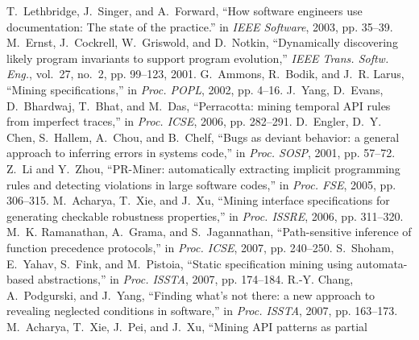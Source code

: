 \documentclass[10pt, conference, compsocconf]{IEEEtran}
\begin{document}
\begin{thebibliography}{10}
T.~Lethbridge, J.~Singer, and A.~Forward, ``How software engineers use
  documentation: The state of the practice.'' in \emph{IEEE Software}, 2003,
  pp. 35--39.
\vspace*{-2ex}
M.~Ernst, J.~Cockrell, W.~Griswold, and D.~Notkin, ``Dynamically discovering
  likely program invariants to support program evolution,'' \emph{IEEE Trans.
  Softw. Eng.}, vol.~27, no.~2, pp. 99--123, 2001.
\vspace*{-2ex}
G.~Ammons, R.~Bodik, and J.~R. Larus, ``{Mining specifications},'' in
  \emph{Proc. POPL}, 2002, pp. 4--16.
\vspace*{-2ex}
J.~Yang, D.~Evans, D.~Bhardwaj, T.~Bhat, and M.~Das, ``{Perracotta: mining
  temporal API rules from imperfect traces},'' in \emph{Proc. ICSE}, 2006, pp.
  282--291.
\vspace*{-2ex}
\vfill\eject
{}
D.~Engler, D.~Y. Chen, S.~Hallem, A.~Chou, and B.~Chelf, ``{Bugs as deviant
  behavior: a general approach to inferring errors in systems code},'' in
  \emph{Proc. SOSP}, 2001, pp. 57--72.
\vspace*{-2ex}
Z.~Li and Y.~Zhou, ``{{PR-Miner}: automatically extracting implicit programming
  rules and detecting violations in large software codes},'' in \emph{Proc.
  FSE}, 2005, pp. 306--315.
\vspace*{-2ex}
M.~Acharya, T.~Xie, and J.~Xu, ``{Mining interface specifications for
  generating checkable robustness properties},'' in \emph{Proc. ISSRE}, 2006,
  pp. 311--320.
\vspace*{-2ex}
M.~K. Ramanathan, A.~Grama, and S.~Jagannathan, ``{Path-sensitive inference of
  function precedence protocols},'' in \emph{Proc. ICSE}, 2007, pp. 240--250.
\vspace*{-2ex}
S.~Shoham, E.~Yahav, S.~Fink, and M.~Pistoia, ``{Static specification mining
  using automata-based abstractions},'' in \emph{Proc. ISSTA}, 2007, pp.
  174--184.
\vspace*{-2ex}
R.-Y. Chang, A.~Podgurski, and J.~Yang, ``{Finding what's not there: a new
  approach to revealing neglected conditions in software},'' in \emph{Proc.
  ISSTA}, 2007, pp. 163--173.
\vspace*{-2ex}
M.~Acharya, T.~Xie, J.~Pei, and J.~Xu, ``{Mining {API} patterns as partial
}
\end{thebibliography}
\end{document}
